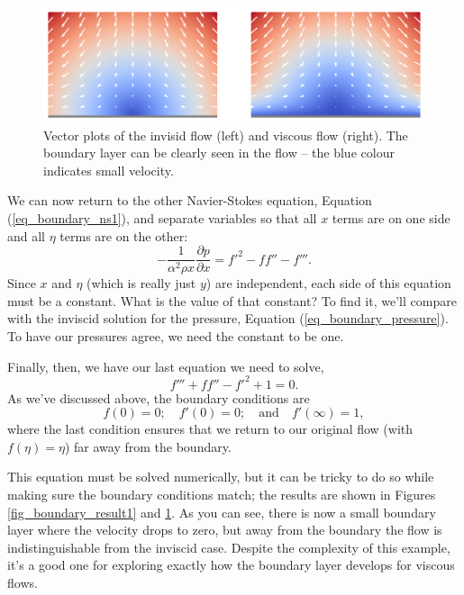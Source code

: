 \begin{figure}
\centering
\includegraphics[width=\linewidth]{Figures/Chapter6/fig_boundary_result2}
\caption{Vector plots of the invisid flow (left) and viscous flow (right).  The boundary layer can be clearly seen in the flow -- the blue colour indicates small velocity. }
\label{fig_boundary_result2}
\end{figure}

We can now return to the other Navier-Stokes equation, Equation (\ref{eq_boundary_ns1}), and separate variables so that all $x$ terms are on one side and all $\eta$ terms are on the other:
\[
-\frac{1}{\alpha^2 \rho x} \frac{\partial p}{\partial x} = f'^2 - ff'' - f'''.
\]
Since $x$ and $\eta$ (which is really just $y$) are independent, each side of this equation must be a constant.  What is the value of that constant?  To find it, we'll compare with the inviscid solution for the pressure, Equation (\ref{eq_boundary_pressure}).  To have our pressures agree, we need the constant to be one.

Finally, then, we have our last equation we need to solve,
\begin{equation}
f''' + ff'' - f'^2 + 1 = 0.
\end{equation}
As we've discussed above, the boundary conditions are
\[
f(0) = 0; \quad f'(0) = 0; \quad \text{and} \quad f'(\infty) = 1,
\]
where the last condition ensures that we return to our original flow (with $f(\eta) = \eta$) far away from the boundary.

This equation must be solved numerically, but it can be tricky to do so while making sure the boundary conditions match; the results are shown in Figures \ref{fig_boundary_result1} and \ref{fig_boundary_result2}.  As you can see, there is now a small boundary layer where the velocity drops to zero, but away from the boundary the flow is indistinguishable from the inviscid case.  Despite the complexity of this example, it's a good one for exploring exactly how the boundary layer develops for viscous flows.





